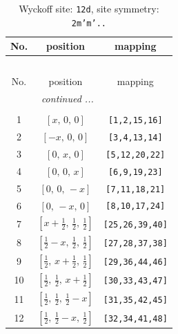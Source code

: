 \documentclass[fleqn,8pt]{jsarticle}
\begin{document}
\begin{longtable}{ccc}
\caption{Wyckoff site: {\tt 12d}, site symmetry: {\tt 2m'm'..}}
 \\
 \hline \hline
No. & position & mapping \\ \hline \endfirsthead

\multicolumn{2}{l}{\tablename\ \thetable{}} \\
 \hline \hline
No. & position & mapping \\ \hline \endhead

 \hline \hline
\multicolumn{2}{r}{\footnotesize\it continued ...} \\ \endfoot

 \hline \hline
\multicolumn{2}{r}{} \\ \endlastfoot

1 & $\left[ x,\, 0,\, 0 \right]$ & {\tt [1,2,15,16]} \\ \hline
2 & $\left[ - x,\, 0,\, 0 \right]$ & {\tt [3,4,13,14]} \\ \hline
3 & $\left[ 0,\, x,\, 0 \right]$ & {\tt [5,12,20,22]} \\ \hline
4 & $\left[ 0,\, 0,\, x \right]$ & {\tt [6,9,19,23]} \\ \hline
5 & $\left[ 0,\, 0,\, - x \right]$ & {\tt [7,11,18,21]} \\ \hline
6 & $\left[ 0,\, - x,\, 0 \right]$ & {\tt [8,10,17,24]} \\ \hline
7 & $\left[ x + \frac{1}{2},\, \frac{1}{2},\, \frac{1}{2} \right]$ & {\tt [25,26,39,40]} \\ \hline
8 & $\left[ \frac{1}{2} - x,\, \frac{1}{2},\, \frac{1}{2} \right]$ & {\tt [27,28,37,38]} \\ \hline
9 & $\left[ \frac{1}{2},\, x + \frac{1}{2},\, \frac{1}{2} \right]$ & {\tt [29,36,44,46]} \\ \hline
10 & $\left[ \frac{1}{2},\, \frac{1}{2},\, x + \frac{1}{2} \right]$ & {\tt [30,33,43,47]} \\ \hline
11 & $\left[ \frac{1}{2},\, \frac{1}{2},\, \frac{1}{2} - x \right]$ & {\tt [31,35,42,45]} \\ \hline
12 & $\left[ \frac{1}{2},\, \frac{1}{2} - x,\, \frac{1}{2} \right]$ & {\tt [32,34,41,48]} \\
\end{longtable}
\renewcommand{\arraystretch}{1.2}
\end{document}
